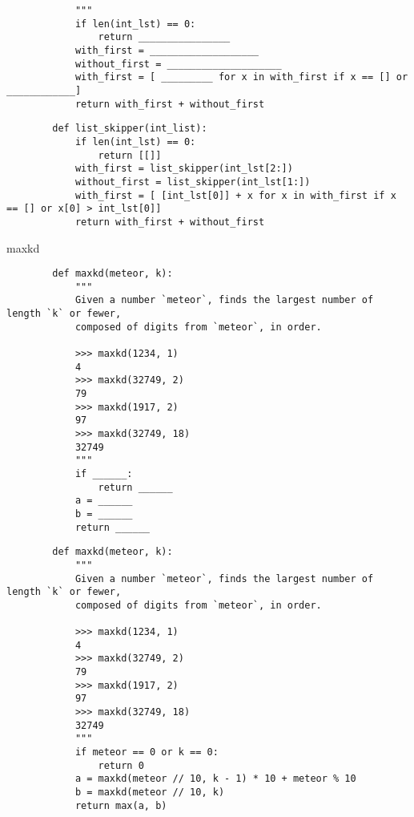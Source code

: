 \documentclass{exam}
\begin{document}
\begin{questions}
\begin{blocksection}
\begin{blocksection}
\begin{lstlisting}
            """
            if len(int_lst) == 0:
                return ________________
            with_first = ___________________
            without_first = ____________________
            with_first = [ _________ for x in with_first if x == [] or ____________]
            return with_first + without_first
        \end{lstlisting}
    \end{blocksection}
    \begin{solution}
        \begin{lstlisting}
        def list_skipper(int_list):
            if len(int_lst) == 0:
                return [[]]
            with_first = list_skipper(int_lst[2:])
            without_first = list_skipper(int_lst[1:])
            with_first = [ [int_lst[0]] + x for x in with_first if x == [] or x[0] > int_lst[0]]
            return with_first + without_first
        \end{lstlisting}
    \end{solution}
	\question maxkd
    \begin{blocksection}
        \begin{lstlisting}
        def maxkd(meteor, k):
            """
            Given a number `meteor`, finds the largest number of length `k` or fewer,
            composed of digits from `meteor`, in order.
        
            >>> maxkd(1234, 1)
            4
            >>> maxkd(32749, 2)
            79
            >>> maxkd(1917, 2)
            97
            >>> maxkd(32749, 18)
            32749
            """
            if ______:
                return ______
            a = ______
            b = ______
            return ______
        \end{lstlisting}
    \end{blocksection}
    \begin{solution}
        \begin{lstlisting}
        def maxkd(meteor, k):
            """
            Given a number `meteor`, finds the largest number of length `k` or fewer,
            composed of digits from `meteor`, in order.

            >>> maxkd(1234, 1)
            4
            >>> maxkd(32749, 2)
            79
            >>> maxkd(1917, 2)
            97
            >>> maxkd(32749, 18)
            32749
            """
            if meteor == 0 or k == 0:
                return 0
            a = maxkd(meteor // 10, k - 1) * 10 + meteor % 10
            b = maxkd(meteor // 10, k)
            return max(a, b)
        \end{lstlisting}
    \end{solution}

\end{blocksection}
\end{questions}
\end{document}
